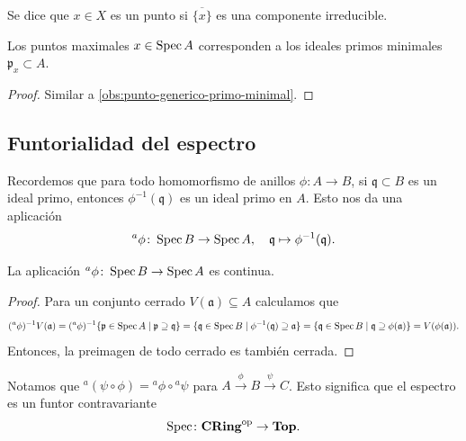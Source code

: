 \documentclass{article}
\numberwithin{equation}{section}
\theoremstyle{definition}
\begin{document}
\begin{definicion}
  Se dice que $x \in X$ es un punto  si $\overline{\{ x \}}$ es
  una componente irreducible.
\end{definicion}

\begin{observacion}
  Los puntos maximales $x \in \operatorname{Spec} A$ corresponden a los ideales primos
  minimales $\mathfrak{p}_x \subset A$.

  \begin{proof}
    Similar a \ref{obs:punto-generico-primo-minimal}.
  \end{proof}
\end{observacion}

\subsection{Funtorialidad del espectro}
\label{sec:funtorialidad-de-Spec}

Recordemos que para todo homomorfismo de anillos $\phi\colon A\to B$,
si $\mathfrak{q} \subset B$ es un ideal primo, entonces
$\phi^{-1} (\mathfrak{q})$ es un ideal primo en $A$. Esto nos da una aplicación
$${}^a \phi\colon \operatorname{Spec} B \to \operatorname{Spec} A, \quad \mathfrak{q} \mapsto \phi^{-1} (\mathfrak{q}).$$

\begin{observacion}
  La aplicación ${}^a \phi\colon \operatorname{Spec} B\to \operatorname{Spec} A$ es continua.

  \begin{proof}
    Para un conjunto cerrado $V (\mathfrak{a}) \subseteq A$ calculamos que
    \[ ({}^a \phi)^{-1} V (\mathfrak{a}) =
       ({}^a \phi)^{-1} \{ \mathfrak{p} \in \operatorname{Spec} A \mid \mathfrak{p} \supseteq \mathfrak{q} \} =
       \{ \mathfrak{q} \in \operatorname{Spec} B \mid \phi^{-1} (\mathfrak{q}) \supseteq \mathfrak{a} \} =
       \{ \mathfrak{q} \in \operatorname{Spec} B \mid \mathfrak{q} \supseteq \phi (\mathfrak{a}) \} =
       V (\phi (\mathfrak{a})). \]
    Entonces, la preimagen de todo cerrado es también cerrada.
  \end{proof}
\end{observacion}

Notamos que ${}^a (\psi\circ \phi) = {}^a \phi\circ {}^a \psi$ para
$A \xrightarrow{\phi} B \xrightarrow{\psi} C$. Esto significa que el espectro es
un funtor contravariante
$$\operatorname{Spec}\colon \text{\bf CRing}^\mathrm{op} \to \text{\bf Top}.$$
\end{document}
